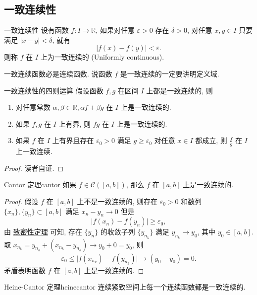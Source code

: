 \documentclass[cn,toc=twocol]{elegantbook}
\newcommand{\ITEMS}{\begin{enumerate}}
\newcommand{\ITEME}{\end{enumerate}}
\newcommand{\R}{\mathbb{R}}
\begin{document}
\subsection{一致连续性}

\begin{definition}{一致连续性}
	设有函数 $f : I \to \R$, 如果对任意 $\varepsilon > 0$ 存在 $\delta >0$, 对任意 $x,y\in I$ 只要满足 $\lvert x - y \rvert < \delta$, 就有
\[
	\lvert f(x) - f(y)\rvert < \varepsilon.
\]
则称 $f$ 在 $I$ 上为一致连续的 (Uniformly continuous).
\end{definition}
\begin{remark}
	一致连续函数必是连续函数. 说函数 $f$ 是一致连续的一定要讲明定义域.	
\end{remark}


\begin{theorem}{一致连续性的四则运算}
假设函数 $f,g$ 在区间 $I$ 上都是一致连续的, 则
\ITEMS
\item 对任意常数 $\alpha, \beta \in \R, \alpha f + \beta g$ 在 $I$ 上是一致连续的.
\item 如果 $f,g$ 在 $I$ 上有界, 则 $fg$ 在 $I$ 上是一致连续的.
\item 如果 $f$ 在 $I$ 上有界且存在 $\varepsilon_0 > 0$ 满足 $g \ge \varepsilon_0$ 对任意 $x \in I$ 都成立, 则 $\frac fg$ 在 $I$ 上一致连续.
\ITEME
\end{theorem}
\begin{proof}
	读者自证.
\end{proof}

\begin{theorem}{Cantor 定理}{cantor}
如果 $f \in \mathscr{C}([a,b])$, 那么 $f$ 在 $[a,b]$ 上是一致连续的.
\end{theorem}
\begin{proof}
假设 $f$ 在 $[a,b]$ 上不是一致连续的, 则存在 $\varepsilon_0 > 0$ 和数列 $\{x_n\},\{y_n\} \subset [a,b]$ 满足 $x_n - y_n \to 0$ 但是 
\[
	\lvert f(x_n) - f(y_n) \rvert \ge \varepsilon_0,
\]
由 \hyperref[R_4']{致密性定理} 可知, 存在 $\{y_n\}$ 的收敛子列 $\{y_{n_k}\}$ 满足 $y_{n_k} \to y_0$, 其中 $y_0 \in [a,b]$. 取 $x_{n_k} = y_{n_k} + (x_{n_k} - y_{n_k}) \to  y_0 + 0 =  y_0$, 则
\[
	\varepsilon_0 \le \lvert f(x_{n_k}) - f(y_{n_k}) \rvert \to (y_0 - y_0) = 0.
\]
矛盾表明函数 $f$ 在 $[a,b]$ 上是一致连续的.
\end{proof}


\begin{theorem}{Heine-Cantor 定理}{heinecantor}
连续紧致空间上每一个连续函数都是一致连续的.
\end{theorem}
\end{document}
